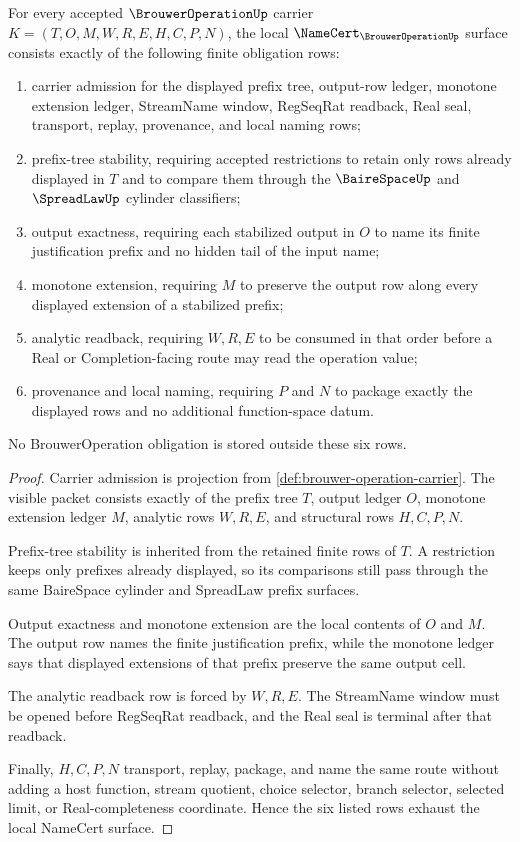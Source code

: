 \begin{theorem}
\label{thm:brouwer-operation-namecert-obligations}
For every accepted $\BrouwerOperationUp$ carrier $K=(T,O,M,W,R,E,H,C,P,N)$, the local $\NameCert_{\BrouwerOperationUp}$ surface consists exactly of the following finite obligation rows:
\begin{enumerate}
\item carrier admission for the displayed prefix tree, output-row ledger, monotone extension ledger, StreamName window, RegSeqRat readback, Real seal, transport, replay, provenance, and local naming rows;
\item prefix-tree stability, requiring accepted restrictions to retain only rows already displayed in $T$ and to compare them through the $\BaireSpaceUp$ and $\SpreadLawUp$ cylinder classifiers;
\item output exactness, requiring each stabilized output in $O$ to name its finite justification prefix and no hidden tail of the input name;
\item monotone extension, requiring $M$ to preserve the output row along every displayed extension of a stabilized prefix;
\item analytic readback, requiring $W,R,E$ to be consumed in that order before a Real or Completion-facing route may read the operation value;
\item provenance and local naming, requiring $P$ and $N$ to package exactly the displayed rows and no additional function-space datum.
\end{enumerate}
No BrouwerOperation obligation is stored outside these six rows.
\end{theorem}
\begin{proof}
Carrier admission is projection from \autoref{def:brouwer-operation-carrier}. The visible packet consists exactly of the prefix tree $T$, output ledger $O$, monotone extension ledger $M$, analytic rows $W,R,E$, and structural rows $H,C,P,N$.

Prefix-tree stability is inherited from the retained finite rows of $T$. A restriction keeps only prefixes already displayed, so its comparisons still pass through the same BaireSpace cylinder and SpreadLaw prefix surfaces.

Output exactness and monotone extension are the local contents of $O$ and $M$. The output row names the finite justification prefix, while the monotone ledger says that displayed extensions of that prefix preserve the same output cell.

The analytic readback row is forced by $W,R,E$. The StreamName window must be opened before RegSeqRat readback, and the Real seal is terminal after that readback.

Finally, $H,C,P,N$ transport, replay, package, and name the same route without adding a host function, stream quotient, choice selector, branch selector, selected limit, or Real-completeness coordinate. Hence the six listed rows exhaust the local NameCert surface.
\end{proof}

